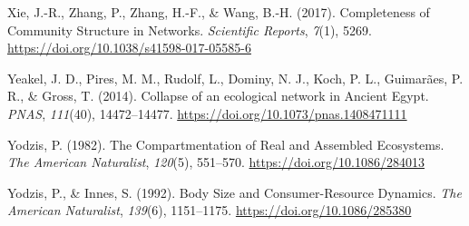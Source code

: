 \documentclass[
]{article}
\newlength{\cslhangindent}
\newenvironment{CSLReferences}[2] %
 {\begin{list}{}{%
  \setlength{\itemindent}{0pt}
  \setlength{\leftmargin}{0pt}
  \setlength{\parsep}{0pt}
  \ifodd #1
   \setlength{\leftmargin}{\cslhangindent}
   \setlength{\itemindent}{-1\cslhangindent}
  \fi
  \setlength{\itemsep}{#2\baselineskip}}}
 {\end{list}}
\begin{document}
\begin{CSLReferences}{1}{0}
Xie, J.-R., Zhang, P., Zhang, H.-F., \& Wang, B.-H. (2017). Completeness
of {Community Structure} in {Networks}. \emph{Scientific Reports},
\emph{7}(1), 5269. \url{https://doi.org/10.1038/s41598-017-05585-6}

Yeakel, J. D., Pires, M. M., Rudolf, L., Dominy, N. J., Koch, P. L.,
Guimarães, P. R., \& Gross, T. (2014). Collapse of an ecological network
in {Ancient Egypt}. \emph{PNAS}, \emph{111}(40), 14472--14477.
\url{https://doi.org/10.1073/pnas.1408471111}

Yodzis, P. (1982). The {Compartmentation} of {Real} and {Assembled
Ecosystems}. \emph{The American Naturalist}, \emph{120}(5), 551--570.
\url{https://doi.org/10.1086/284013}

Yodzis, P., \& Innes, S. (1992). Body {Size} and {Consumer-Resource
Dynamics}. \emph{The American Naturalist}, \emph{139}(6), 1151--1175.
\url{https://doi.org/10.1086/285380}

\end{CSLReferences}
\end{document}

